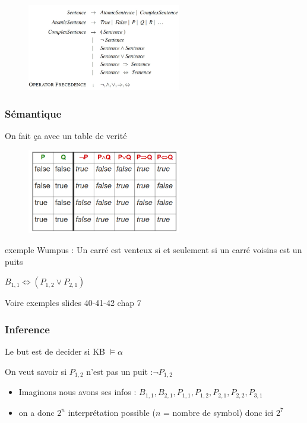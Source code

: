 \documentclass[12pt]{article}
\begin{document}
			\begin{figure}[htp]	
				\centering
				\includegraphics[width=0.6\textwidth]{img/KBA3.png}
			\end{figure}
			
			\subsubsection{Sémantique}
			On fait ça avec un table de verité
			\begin{figure}[htp]	
				\centering
				\includegraphics[width=0.6\textwidth]{img/KBA4.png}
			\end{figure}
			
			exemple Wumpus : Un carré est venteux si et seulement si un carré voisins est un puits
			
			$B_{1,1} \Leftrightarrow (P_{1,2} \vee P_{2,1})$
			
			Voire exemples slides 40-41-42 chap 7
			
		\subsubsection{Inference}
			Le but est de decider si KB $\models \alpha$
			
			On veut savoir si $P_{1,2}$ n'est pas un puit :$\neg P_{1,2}$
			\begin{itemize}
				\item Imaginons nous avons ses infos : $B_{1,1}, B_{2,1}, P_{1,1}, P_{1,2}, P_{2,1}, P_{2,2}, P_{3,1}$
				\item on a donc $2^n$ interprétation possible ($n$ = nombre de symbol) donc ici $2^7$
			\end{itemize}
			
\end{document}
